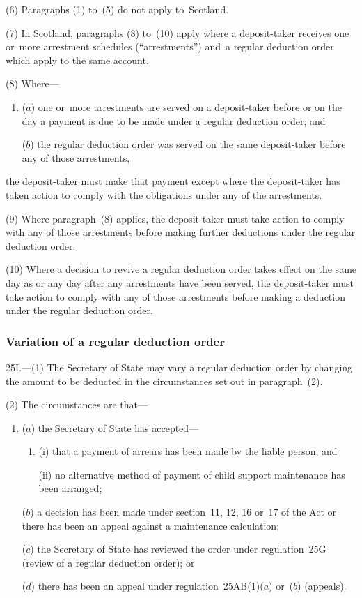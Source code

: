 \documentclass[12pt,a4paper]{article}
\begin{document}
(6) Paragraphs (1) to~(5) do not apply to~Scotland.

(7) In Scotland, paragraphs (8) to~(10) apply where a deposit-taker receives one or~more arrestment schedules (“arrestments”) and~a regular deduction order which apply to the same account.

(8) Where—
\begin{enumerate}\item[]
($a$) one or~more arrestments are served on a deposit-taker before or on the day a payment is due to be made under a regular deduction order; and

($b$) the regular deduction order was served on the same deposit-taker before any of those arrestments,
\end{enumerate}
the deposit-taker must make that payment except where the deposit-taker has taken action to comply with the obligations under any of the arrestments.

(9) Where paragraph~(8) applies, the deposit-taker must take action to comply with any of those arrestments before making further deductions under the regular deduction order.

(10) Where a decision to revive a regular deduction order takes effect on the same day as or any day after any arrestments have been served, the deposit-taker must take action to comply with any of those arrestments before making a deduction under the regular deduction order.

\subsubsection[25I. Variation of a regular deduction order]{Variation of a regular deduction order}

25I.---(1)  The 
Secretary of State  %
may vary a regular deduction order by changing the amount to be deducted in the circumstances set out in paragraph~(2).

(2) The circumstances are that—
\begin{enumerate}\item[]
($a$) the 
Secretary of State  %
has accepted—
\begin{enumerate}\item[]
(i) that a payment of arrears has been made by the liable person, and

(ii) no alternative method of payment of child support maintenance has been arranged;
\end{enumerate}

($b$) a decision has been made under section~11, 12, 16 or~17 of the Act or there has been an appeal against a maintenance calculation;

($c$) the 
Secretary of State  %
has reviewed the order under regulation~25G (review of a regular deduction order); or

($d$) there has been an appeal under regulation~25AB(1)($a$)  or~($b$)  (appeals).
\end{enumerate}
\end{document}
